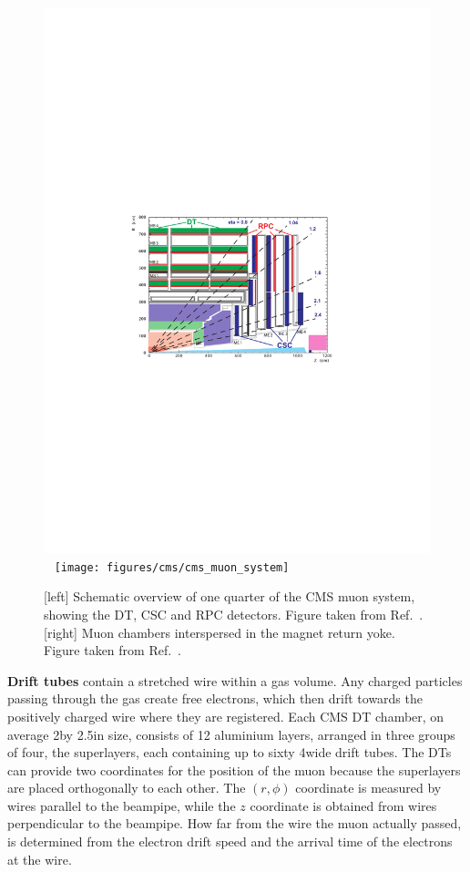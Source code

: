 \begin{figure}[tpb]
  \centering
  \includegraphics[height=0.205\textheight]{figures/cms/CMS_muon_system_diagram}
~
  \texttt{[image: figures/cms/cms\_muon\_system]}
  \caption{[left] Schematic overview of one quarter of the CMS muon system, showing the DT, CSC and
RPC detectors. Figure taken from Ref.~\cite{Bayatian:922757}.
  [right] Muon chambers interspersed in the magnet return yoke. Figure taken from
Ref.~\cite{CMS_muon_system}.
  \label{fig:cms_muon_system}}
\end{figure}

\textbf{Drift tubes} contain a stretched wire within a gas volume. Any charged particles passing
through the gas create free electrons, which then drift towards the positively charged wire where
they are registered.  
Each CMS DT chamber, on average 2\meter by 2.5\meter in size, consists of 12 aluminium layers,
arranged in three groups of four, the superlayers, each containing up to sixty 4\cm wide drift
tubes.
The DTs can provide two coordinates for the position of the muon because the superlayers are placed
orthogonally to each other. The $(r, \phi)$ coordinate is measured by wires parallel to the
beampipe, while the $z$ coordinate is obtained from wires perpendicular to the beampipe. 
How far from the wire the muon actually passed, is determined from the electron drift speed and the
arrival time of the electrons at the wire.

